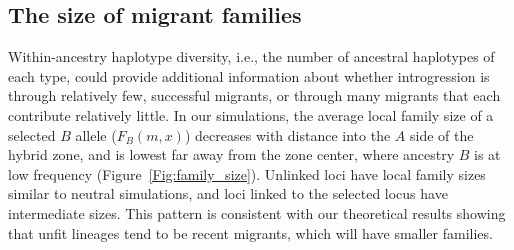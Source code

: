 \documentclass[11pt,letterpaper]{article}
\newcommand{\alisa}[1]{{\em \color{red} #1}}
\begin{document}
\subsection*{The size of migrant families}

Within-ancestry haplotype diversity, i.e., the number of ancestral haplotypes of each type,
could provide additional information about whether introgression is through relatively few, successful migrants, 
or through many migrants that each contribute relatively little. 
In our simulations, the average local family size of a selected $B$ allele ($F_B(m,x)$) decreases with distance into the $A$ side of the hybrid zone, 
and is lowest far away from the zone center, where ancestry $B$ is at low frequency (Figure~\ref{Fig:family_size}). 
Unlinked loci have local family sizes similar to neutral simulations,
and loci linked to the selected locus have intermediate sizes.
This pattern is consistent with our theoretical results showing that unfit lineages tend to be recent migrants, 
which will have smaller families.  

\end{document}
